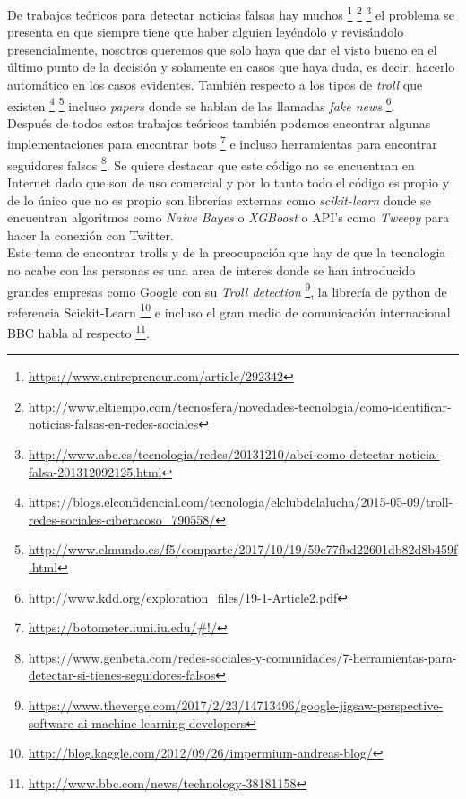 \documentclass[../all.tex]{subfiles}
\begin{document}
    De trabajos teóricos para detectar noticias falsas hay muchos
    \footnote{\tiny\url{https://www.entrepreneur.com/article/292342}\cite{relacionado1}}
    \footnote{\tiny\url{http://www.eltiempo.com/tecnosfera/novedades-tecnologia/como-identificar-noticias-falsas-en-redes-sociales}\cite{relacionado4}}
    \footnote{\tiny\url{http://www.abc.es/tecnologia/redes/20131210/abci-como-detectar-noticia-falsa-201312092125.html}\cite{relacionado5}} el problema se presenta en que siempre tiene que haber alguien leyéndolo y revisándolo presencialmente, nosotros queremos que solo haya que dar el visto bueno en el último punto de la decisión  y solamente en casos que haya duda, es decir, hacerlo automático en los casos evidentes.  También respecto a los tipos de \textit{troll} que existen \footnote{\tiny\url{https://blogs.elconfidencial.com/tecnologia/elclubdelalucha/2015-05-09/troll-redes-sociales-ciberacoso_790558/}\cite{relacionado6}}
    \footnote{\tiny\url{http://www.elmundo.es/f5/comparte/2017/10/19/59e77fbd22601db82d8b459f.html}\cite{relacionado7}} incluso \textit{papers} donde se hablan de las llamadas \textit{fake news} \footnote{\tiny\url{http://www.kdd.org/exploration_files/19-1-Article2.pdf}}.\\

    Después de todos estos trabajos teóricos también podemos encontrar algunas implementaciones para encontrar bots \footnote{\tiny\url{https://botometer.iuni.iu.edu/\#!/}} e incluso herramientas para encontrar seguidores falsos \footnote{\tiny\url{https://www.genbeta.com/redes-sociales-y-comunidades/7-herramientas-para-detectar-si-tienes-seguidores-falsos}\cite{relacionado8}}. Se quiere destacar que este código no se encuentran en Internet dado que son de uso comercial y por lo tanto todo el código es propio y de lo único que no es propio son librerías externas como \textit{scikit-learn} donde se encuentran algoritmos como\textit{ Naive Bayes} o \textit{XGBoost} o API's como \textit{Tweepy} para hacer la conexión con Twitter. \\
    
    Este tema de encontrar trolls y de la preocupación que hay de que la tecnologia no acabe con las personas es una area de interes donde se han introducido grandes empresas como Google con su 
    \textit{Troll detection} \footnote{\tiny\url{https://www.theverge.com/2017/2/23/14713496/google-jigsaw-perspective-software-ai-machine-learning-developers}\cite{relacionado9}}, la librería de python de referencia Scickit-Learn \footnote{\tiny\url{http://blog.kaggle.com/2012/09/26/impermium-andreas-blog/}}
    e incluso el gran medio de comunicación internacional BBC habla al respecto
    \footnote{\tiny \url{http://www.bbc.com/news/technology-38181158}\cite{relacionado10}}.\\
    
\end{document}
